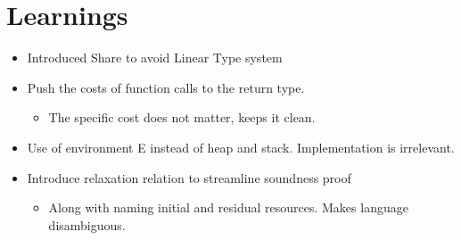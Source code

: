 \chapter{Learnings}
\begin{itemize}
	\item Introduced Share to avoid Linear Type system
	\item Push the costs of function calls to the return type. 
	   \begin{itemize}
	   	\item The specific cost does not matter, keeps it clean.
	   \end{itemize}
	\item Use of environment E instead of heap and stack. Implementation is irrelevant.
	\item Introduce relaxation relation to streamline soundness proof
	\begin{itemize}
		\item Along with naming initial and residual resources. Makes language disambiguous.
	\end{itemize}
\end{itemize}
